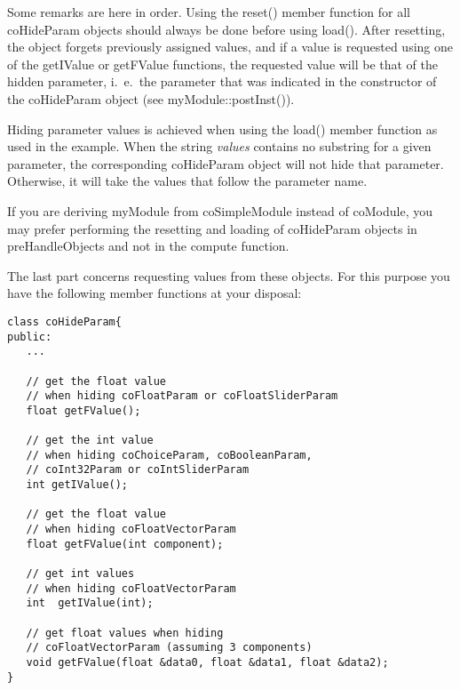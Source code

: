 Some remarks are here in order. Using the reset() member function
for all coHideParam objects should always be done before using
load(). After resetting, the object forgets previously assigned values,
and if a value is requested using one of the getIValue or getFValue
functions, the requested value will be that of the hidden parameter,
i.~e.\ the parameter that was indicated in the constructor
of the coHideParam object (see myModule::postInst()).

Hiding parameter values is achieved when using the load() member function
as used in the example. When the string {\sl values} contains no substring
for a given parameter, the corresponding coHideParam object will
not hide that parameter. Otherwise, it will take the values that follow
the parameter name.

If you are deriving myModule from coSimpleModule instead of
coModule, you may prefer performing the resetting and loading of
coHideParam objects in preHandleObjects and not in the compute function.

The last part concerns requesting values from these objects.
For this purpose you have the following member functions at your
disposal:

\begin{verbatim}
class coHideParam{
public:
   ...

   // get the float value 
   // when hiding coFloatParam or coFloatSliderParam
   float getFValue();

   // get the int value 
   // when hiding coChoiceParam, coBooleanParam, 
   // coInt32Param or coIntSliderParam
   int getIValue();

   // get the float value 
   // when hiding coFloatVectorParam
   float getFValue(int component);

   // get int values 
   // when hiding coFloatVectorParam
   int  getIValue(int);

   // get float values when hiding 
   // coFloatVectorParam (assuming 3 components)
   void getFValue(float &data0, float &data1, float &data2);
}
\end{verbatim}



